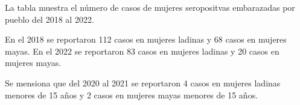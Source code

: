 La tabla muestra el número de casos de mujeres seropositvas embarazadas por pueblo del 2018 al 2022.  

En el 2018 se reportaron 112 casos en mujeres ladinas y 68 casos en mujeres mayas. En el 2022 se reportaron 83 casos en mujeres ladinas y 20 casos en mujeres mayas. 

Se mensiona que del 2020 al 2021 se reportaron 4 casos en mujeres ladinas menores de 15 años y 2 casos en mujeres mayas menores de 15 años. 